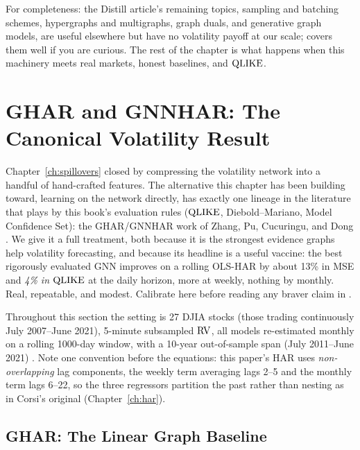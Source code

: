 For completeness: the Distill article's remaining topics, sampling and batching schemes, hypergraphs and multigraphs, graph duals, and generative graph models, are useful elsewhere but have no volatility payoff at our scale; \citet{SanchezLengeling2021} covers them well if you are curious. The rest of the chapter is what happens when this machinery meets real markets, honest baselines, and $\operatorname{QLIKE}$.

\section{GHAR and GNNHAR: The Canonical Volatility Result}\label{sec:gnn:gnnhar}

Chapter~\ref{ch:spillovers} closed by compressing the volatility network into a handful of hand-crafted features. The alternative this chapter has been building toward, learning on the network directly, has exactly one lineage in the literature that plays by this book's evaluation rules ($\operatorname{QLIKE}$, Diebold--Mariano, Model Confidence Set): the GHAR/GNNHAR work of Zhang, Pu, Cucuringu, and Dong \citep{ZhangCucuringuDong2023, ZhangPuCucuringuDong2024}. We give it a full treatment, both because it is the strongest evidence graphs help volatility forecasting, and because its headline is a useful vaccine: the best rigorously evaluated GNN improves on a rolling OLS-HAR by about 13\% in MSE and \emph{4\% in $\operatorname{QLIKE}$} at the daily horizon, more at weekly, nothing by monthly. Real, repeatable, and modest. Calibrate here before reading any braver claim in .

Throughout this section the setting is 27 DJIA stocks (those trading continuously July 2007--June 2021), 5-minute subsampled $\operatorname{RV}$, all models re-estimated monthly on a rolling 1000-day window, with a 10-year out-of-sample span (July 2011--June 2021) \citep[pp.~13--14]{ZhangCucuringuDong2023}. Note one convention before the equations: this paper's HAR uses \emph{non-overlapping} lag components, the weekly term averaging lags 2--5 and the monthly term lags 6--22, so the three regressors partition the past rather than nesting as in Corsi's original (Chapter~\ref{ch:har}).

\subsection{GHAR: The Linear Graph Baseline}\label{sec:gnn:ghar}

